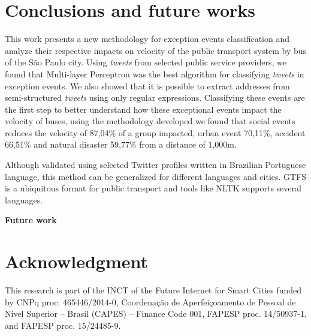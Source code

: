 \documentclass[runningheads]{llncs}
\begin{document}
\section{Conclusions and future works}

This work presents a new methodology for exception events classification and analyze their respective impacts on velocity of the public transport system by bus of the São Paulo city. Using \textit{tweets} from selected public service providers, we found that Multi-layer Perceptron was the best algorithm for classifying \textit{tweets} in exception events. We also showed that it is possible to extract addresses from semi-structured \textit{tweets} using only regular expressions. Classifying these events are the first step to better understand how these exceptional events impact the velocity of buses, using the methodology developed we found that social events reduces the velocity of 87,04\% of a group impacted, urban event 70,11\%, accident 66,51\% and natural disaster 59,77\% from a distance of 1,000m.

Although validated using selected Twitter profiles written in Brazilian Portuguese language, this method can be generalized for different languages and cities. GTFS is a ubiquitous format for public transport and tools like NLTK supports several languages.

\textbf{Future work}


\section*{Acknowledgment}
This research is part of the INCT of the Future Internet for Smart Cities funded by CNPq proc. 465446/2014-0, Coordenação de Aperfeiçoamento de Pessoal de Nível Superior -- Brasil (CAPES) -- Finance Code 001, FAPESP proc. 14/50937-1, and FAPESP proc. 15/24485-9.



\end{document}
